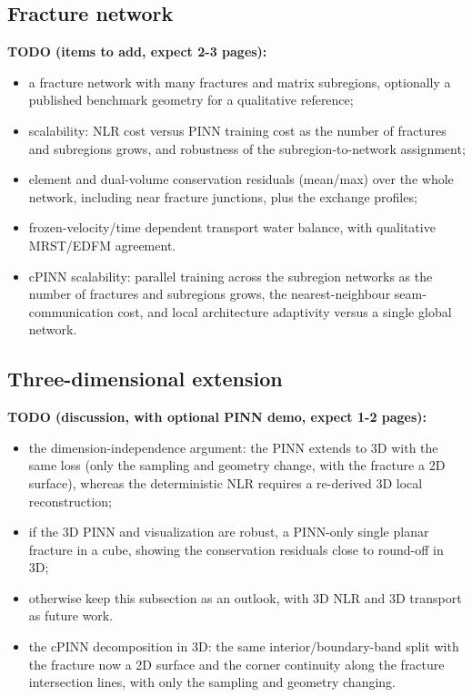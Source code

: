 \documentclass[a4paper,fleqn]{cas-sc}
\begin{document}
\subsection{Fracture network}
\label{subsec:fracture-network}

{\color{red}
\noindent\textbf{TODO (items to add, expect 2-3 pages):}
\begin{itemize}
\item a fracture network with many fractures and matrix subregions, optionally a published benchmark geometry for a qualitative reference;
\item scalability: NLR cost versus PINN training cost as the number of fractures and subregions grows, and robustness of the subregion-to-network assignment;
\item element and dual-volume conservation residuals (mean/max) over the whole network, including near fracture junctions, plus the exchange profiles;
\item frozen-velocity/time dependent transport water balance, with qualitative MRST/EDFM agreement.
\item cPINN scalability: parallel training across the subregion networks as the number of fractures and subregions grows, the nearest-neighbour seam-communication cost, and local architecture adaptivity versus a single global network.
\end{itemize}
}

\subsection{Three-dimensional extension}
\label{subsec:three-dimensional}

{\color{red}
\noindent\textbf{TODO (discussion, with optional PINN demo, expect 1-2 pages):}
\begin{itemize}
\item the dimension-independence argument: the PINN extends to 3D with the same loss (only the sampling and geometry change, with the fracture a 2D surface), whereas the deterministic NLR requires a re-derived 3D local reconstruction;
\item if the 3D PINN and visualization are robust, a PINN-only single planar fracture in a cube, showing the conservation residuals close to round-off in 3D;
\item otherwise keep this subsection as an outlook, with 3D NLR and 3D transport as future work.
\item the cPINN decomposition in 3D: the same interior/boundary-band split with the fracture now a 2D surface and the corner continuity along the fracture intersection lines, with only the sampling and geometry changing.
\end{itemize}
}
\end{document}
